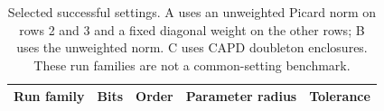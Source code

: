 \begin{table}[htbp]
\centering\small
\begin{tabular}{@{}lcccc@{}}
\toprule
Run family & Bits & Order & Parameter radius & Tolerance\\
\midrule
\bottomrule
\end{tabular}
\caption{Selected successful settings. A uses an unweighted Picard
norm on rows 2 and 3 and a fixed diagonal weight on the other rows;
B uses the unweighted norm. C uses CAPD doubleton enclosures. These
run families are not a common-setting benchmark.}
\label{tab:settings}
\end{table}
